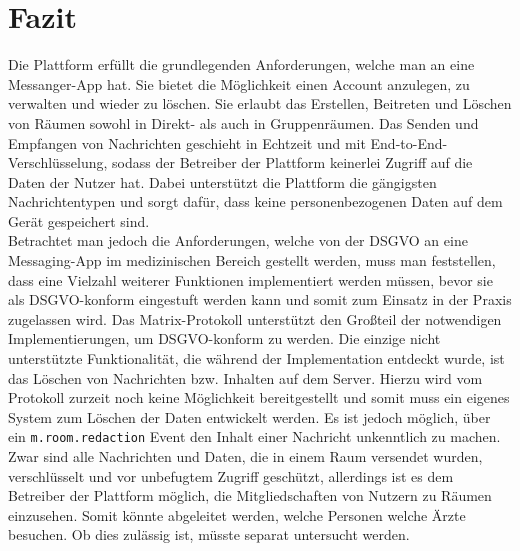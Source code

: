     \chapter{Fazit}\label{ch:fazit}
    Die Plattform erfüllt die grundlegenden Anforderungen, welche man an eine Messanger-App hat.
    Sie bietet die Möglichkeit einen Account anzulegen, zu verwalten und wieder zu löschen.
    Sie erlaubt das Erstellen, Beitreten und Löschen von Räumen sowohl in Direkt- als auch in Gruppenräumen.
    Das Senden und Empfangen von Nachrichten geschieht in Echtzeit und mit End-to-End-Verschlüsselung, sodass der Betreiber der Plattform keinerlei Zugriff auf die Daten der Nutzer hat.
    Dabei unterstützt die Plattform die gängigsten Nachrichtentypen und sorgt dafür, dass keine personenbezogenen Daten auf dem Gerät gespeichert sind.\\
    Betrachtet man jedoch die Anforderungen, welche von der DSGVO an eine Messaging-App im medizinischen Bereich gestellt werden, muss man feststellen, dass eine Vielzahl weiterer Funktionen implementiert werden müssen, bevor sie als DSGVO-konform eingestuft werden kann und somit zum Einsatz in der Praxis zugelassen wird.
    Das Matrix-Protokoll unterstützt den Großteil der notwendigen Implementierungen, um DSGVO-konform zu werden.
    Die einzige nicht unterstützte Funktionalität, die während der Implementation entdeckt wurde, ist das Löschen von Nachrichten bzw. Inhalten auf dem Server.
    Hierzu wird vom Protokoll zurzeit noch keine Möglichkeit bereitgestellt und somit muss ein eigenes System zum Löschen der Daten entwickelt werden.
    Es ist jedoch möglich, über ein \texttt{m.room.redaction} Event den Inhalt einer Nachricht unkenntlich zu machen.\\
    Zwar sind alle Nachrichten und Daten, die in einem Raum versendet wurden, verschlüsselt und vor unbefugtem Zugriff geschützt, allerdings ist es dem Betreiber der Plattform möglich, die Mitgliedschaften von Nutzern zu Räumen einzusehen.
    Somit könnte abgeleitet werden, welche Personen welche Ärzte besuchen.
    Ob dies zulässig ist, müsste separat untersucht werden.



